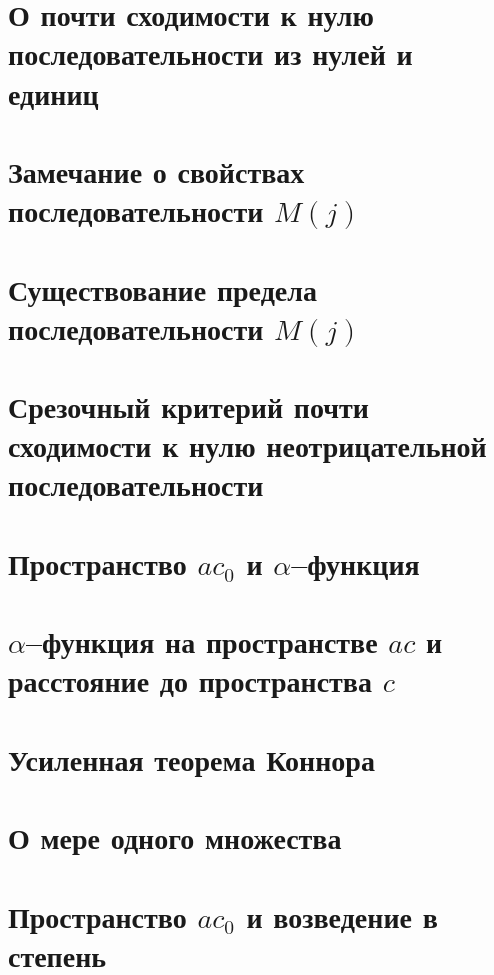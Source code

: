 \documentclass[12pt,a4paper,openbib]{report}
\theoremstyle{definition}
\begin{document}
	\section{О почти сходимости к нулю последовательности из нулей и единиц}
	

	\section{Замечание о свойствах последовательности $M(j)$}
	

	\section{Существование предела последовательности $M(j)$}
	

	\section{Срезочный критерий почти сходимости к нулю неотрицательной последовательности}
	

	\section{Пространство $ac_0$ и $\alpha$--функция}
	

	\section{$\alpha$--функция на пространстве $ac$ и расстояние до пространства $c$}
	

	\section{Усиленная теорема Коннора}
	

	\section{О мере одного множества}
	

	\section{Пространство $ac_0$ и возведение в степень}
	
\end{document}
